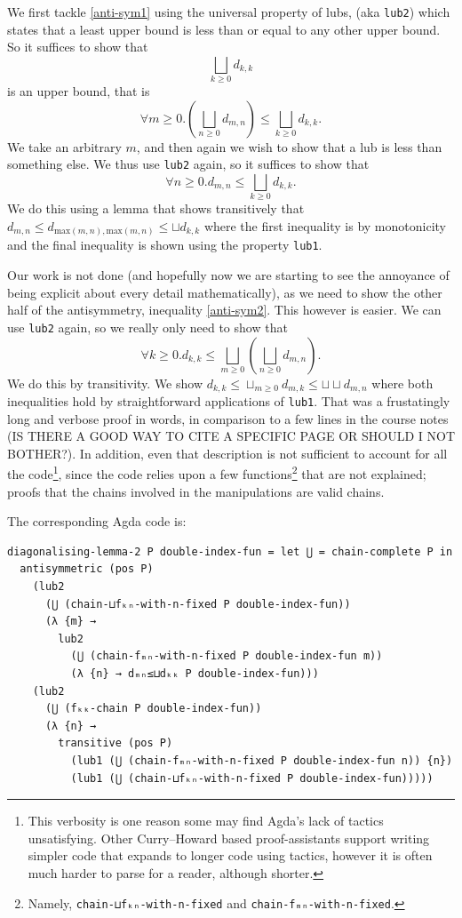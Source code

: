 \documentclass[12pt,a4paper,twoside,openright]{report}
\begin{document}
We first tackle \ref{anti-sym1} using the universal property of lubs, (aka \texttt{lub2}) which states that a least upper bound is less than or equal to any other upper bound. So it suffices to show that 
\[
\bigsqcup_{k \geq 0} d_{k, k} 
\]
is an upper bound, that is
\[
\forall m \geq 0. \left( \bigsqcup_{n\geq 0} d_{m,n} \right) \leq \bigsqcup_{k \geq 0} d_{k, k}.
\]
We take an arbitrary $m$, and then again we wish to show that a lub is less than something else. We thus use \texttt{lub2} again, so it suffices to show that
\[
\forall n \geq 0. d_{m, n} \leq \bigsqcup_{k \geq 0} d_{k , k}.
\]
We do this using a lemma that shows transitively that $d_{m,n} \leq d_{\text{max}(m,n), \text{max}(m,n)} \leq \sqcup d_{k,k}$ where the first inequality is by monotonicity and the final inequality is shown using the property \texttt{lub1}. 

Our work is not done (and hopefully now we are starting to see the annoyance of being explicit about every detail mathematically), as we need to show the other half of the antisymmetry, inequality \ref{anti-sym2}. This however is easier. We can use \texttt{lub2} again, so we really only need to show that
\[
\forall k \geq 0. d_{k,k} \leq \bigsqcup_{m \geq 0} \left( \bigsqcup_{n\geq 0} d_{m,n} \right).
\]
We do this by transitivity. We show $d_{k,k} \leq \sqcup_{m \geq 0} d_{m,k} \leq \sqcup \sqcup d_{m,n}$ where both inequalities hold by straightforward applications of \texttt{lub1}. That was a frustatingly long and verbose proof in words, in comparison to a few lines in the course notes (IS THERE A GOOD WAY TO CITE A SPECIFIC PAGE OR SHOULD I NOT BOTHER?). In addition, even that description is not sufficient to account for all the code\footnote{This verbosity is one reason some may find Agda's lack of tactics unsatisfying. Other Curry--Howard based proof-assistants support writing simpler code that expands to longer code using tactics, however it is often much harder to parse for a reader, although shorter.}, since the code relies upon a few functions\footnote{Namely, \texttt{chain-⊔fₖₙ-with-n-fixed} and \texttt{chain-fₘₙ-with-n-fixed}.} that are not explained; proofs that the chains involved in the manipulations are valid chains. 

The corresponding Agda code is:
\begin{verbatim}
diagonalising-lemma-2 P double-index-fun = let ⋃ = chain-complete P in
  antisymmetric (pos P)
    (lub2
      (⋃ (chain-⊔fₖₙ-with-n-fixed P double-index-fun))
      (λ {m} →
        lub2
          (⋃ (chain-fₘₙ-with-n-fixed P double-index-fun m))
          (λ {n} → dₘₙ≤⊔dₖₖ P double-index-fun)))
    (lub2
      (⋃ (fₖₖ-chain P double-index-fun))
      (λ {n} →
        transitive (pos P)
          (lub1 (⋃ (chain-fₘₙ-with-n-fixed P double-index-fun n)) {n})
          (lub1 (⋃ (chain-⊔fₖₙ-with-n-fixed P double-index-fun)))))
\end{verbatim}
\end{document}
